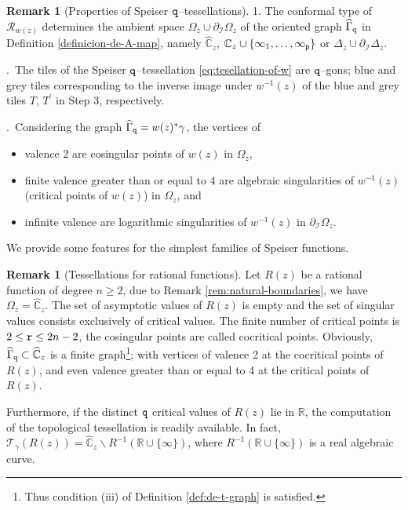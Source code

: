 \documentclass[final,3p,times]{elsarticle}
\makeatletter
\newcommand{\CC}{\ensuremath{{\mathbb C}}}
\newcommand{\CW}{\ensuremath{{\widehat{\mathbb C}}}}
\newcommand{\RR}{\ensuremath{{\mathbb R}}}
\newcommand{\R}{\ensuremath{{\mathcal R}}}
\newcommand*\bigcdot{\mathpalette\bigcdot@{.5}}
\newcommand*\bigcdot@[2]{\mathbin{\vcenter{\hbox{\scalebox{#2}{$\m@th#1\bullet$}}}}}
\theoremstyle{definition}
\newtheorem{remark}[theorem]{Remark}
\makeatother
\begin{document}
\begin{remark}[Properties of Speiser $\tt q$--tessellations]
1.
The conformal type of $\R_{w(z)}$ determines 
the ambient space 
$\Omega_z \cup \partial_{\mathcal{I}}\Omega_z $
of the oriented graph $\widehat{\Gamma}_{\tt q}$ in
Definition \ref{definicion-de-A-map}, namely 
$\CW_z$, $\CC_z\cup \{\infty_1,\ldots,\infty_{\tt p} \}$ 
or $\Delta_z \cup \partial_{\mathcal{I} } \Delta_z $.

.\ 
The tiles of the Speiser $\tt q$--tessellation \eqref{eq:tesellation-of-w}
are $\tt q$--gons; blue and grey tiles 
corresponding to the inverse image under $w^{-1}(z)$ of 
the blue and grey tiles
$T$, $T^\prime$ in Step 3, respectively.

.\ Considering the graph $\widehat{\Gamma}_{\tt q}=w(z)^*\gamma$,
the vertices of 
\begin{itemize}[label=$\bigcdot$ ,leftmargin=*]
\item
valence 2 are cosingular points of $w(z)$ in $\Omega_z$,

\item 
finite valence greater than or equal to 4 are algebraic singularities of $w^{-1}(z)$ (critical points of $w(z)$) in $\Omega_z$, and

\item
infinite valence are logarithmic singularities of $w^{-1}(z)$ in 
$\partial_{\mathcal{I}}\Omega_z$.
\end{itemize}
\end{remark}


We provide some features for the simplest 
families of Speiser functions.


\begin{remark}[Tessellations for rational functions]
Let 
$R(z)$ be a rational function of degree $n \geq 2$,
due to Remark \ref{rem:natural-boundaries}, 
we have  $\Omega_z = \CW_z$.
The set of asymptotic values of $R(z)$ is empty 
and 
the set of singular values consists exclusively of 
critical values.
The finite number of critical points is $ 2\leq {\tt r} \leq 2n-2$,
the cosingular points are called cocritical points.
Obviously,
$\widehat{\Gamma}_{\tt q}\subset \CW_z$ 
is a finite graph\footnote{
Thus condition (iii) of Definition \ref{def:de-t-graph} is satisfied.};  
with vertices of 
valence 2 at the cocritical points of $R(z)$, 
and even valence greater than
or equal to 4 at the critical points of $R(z)$.

\noindent
Furthermore, 
if the distinct ${\tt q}$ critical values of $R(z)$ lie in $\RR$,
the computation of the topological tessellation is readily available. 
In fact, $\mathscr{T}_\gamma(R(z)) = \CW_z\backslash R^{-1}(\RR\cup\{\infty\})$,
where $R^{-1}(\RR\cup\{\infty\})$ is a real algebraic curve.
\end{remark}
\end{document}
